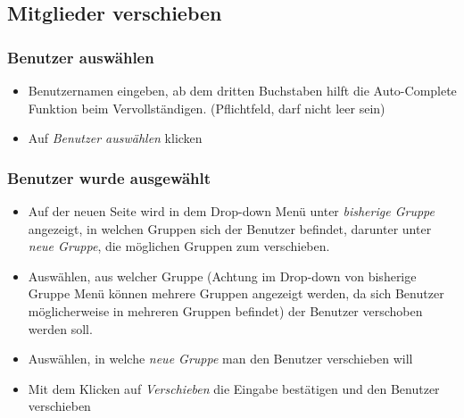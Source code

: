 \newpage
\subsection*{Mitglieder verschieben}
\subsubsection*{Benutzer auswählen}
\begin{itemize}
	\item Benutzernamen eingeben, ab dem dritten Buchstaben hilft die Auto-Complete Funktion beim Vervollständigen. (Pflichtfeld, darf nicht leer sein)
	\item Auf \textit{Benutzer auswählen} klicken
\end{itemize}
\subsubsection*{Benutzer wurde ausgewählt}
\begin{itemize}
	\item Auf der neuen Seite wird in dem Drop-down Menü unter \textit{bisherige Gruppe} angezeigt, in welchen Gruppen sich der Benutzer befindet, darunter unter \textit{neue Gruppe}, die möglichen Gruppen zum verschieben.
	\item Auswählen, aus welcher Gruppe (Achtung im Drop-down von bisherige Gruppe Menü können mehrere Gruppen angezeigt werden, da sich Benutzer möglicherweise in mehreren Gruppen befindet) der Benutzer verschoben werden soll.
	\item Auswählen, in welche \textit{neue Gruppe} man den Benutzer verschieben will
	\item Mit dem Klicken auf \textit{Verschieben} die Eingabe bestätigen und den Benutzer verschieben
\end{itemize}


\clearpage